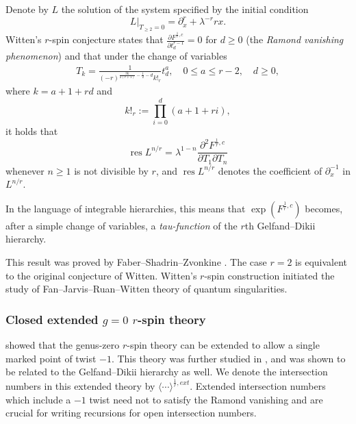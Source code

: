 \documentclass[11pt]{amsart}
\theoremstyle{definition}
\theoremstyle{remark}
\newcommand{\<}{\left<}
\renewcommand{\>}{\right>}
\DeclareMathOperator{\res}{res}
\numberwithin{equation}{section}
\begin{document}
Denote %
by $L$ the solution of the system specified by the initial %
condition
\begin{equation}\label{eq:init_cond_L}
L|_{T_{\geq 2}=0}=\partial_x^r+\lambda^{-r}rx.
\end{equation}
Witten's %
$r$-spin conjecture states that $\frac{\partial F^{\frac{1}{r},c}}{\partial t^{r-1}_d}=0$ for $d\geq 0$ (the \emph{Ramond vanishing phenomenon}) and that under the change of variables
\begin{gather}\label{eq:closed r-spin change of variables}
T_k=\frac{1}{(-r)^{\frac{3k}{2(r+1)}-\frac{1}{2}-d}k!_r}t^a_d,\quad 0\le a\le r-2,\quad d\ge 0,
\end{gather}
where $k=a+1+rd$ and
$$
k!_r:=\prod_{i=0}^d(a+1+ri),
$$
it holds that
$$
\res L^{n/r}=\lambda^{1-n}\frac{\partial^2 F^{\frac{1}{r},c}}{\partial T_1\partial T_n}
$$
whenever $n\geq 1$ is not divisible by $r$, and $\res L^{n/r}$ denotes the coefficient of $\partial_x^{-1}$ in $L^{n/r}$.

In the language of %
integrable hierarchies, this %
means that  $\exp(F^{\frac{1}{r},c})$ becomes, after a simple change of variables, a \emph{tau-function} of the $r$th Gelfand--Dikii hierarchy.  


This result %
was proved by %
Faber--Shadrin--Zvonkine \cite{FSZ10}.  The case $r=2$ is equivalent to the original conjecture of Witten. Witten's $r$-spin construction initiated the study of Fan--Jarvis--Ruan--Witten \cite{FJR} theory of quantum singularities.

\subsubsection{Closed extended $g=0$ $r$-spin theory}
\cite{JKV2} showed that the genus-zero $r$-spin theory can be extended to allow a single marked point of twist $-1$. This theory was further studied in \cite{BCT_Closed_Extended}, and was shown to be related to the Gelfand--Dikii hierarchy as well. We denote the intersection numbers in this extended theory by $\langle\cdots\rangle^{\frac{1}{r},ext}.$ Extended intersection numbers which include a $-1$ twist need not to satisfy the %
Ramond vanishing and %
are crucial for writing recursions for open intersection numbers.
\end{document}
